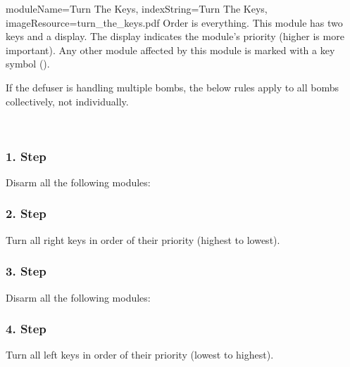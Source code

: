 \documentclass{../../ktane-mod}
\begin{document}
\begin{module}{
  moduleName=Turn The Keys,
  indexString=Turn The Keys,
  imageResource=turn_the_keys.pdf
}
{
  Order is everything.
}
  This module has two keys and a display.
  The display indicates the module's priority (higher is more important).
  Any other module affected by this module is marked with a key symbol (\keysymbol).

  If the defuser is handling multiple bombs, the below rules apply to all bombs collectively, not individually.

  \medskip\\
  \begin{multicols}{2}
  \begin{bulletlist}
  \end{bulletlist}
  \end{multicols}

  \subsubsection*{1. Step}
  Disarm all the following modules:
  \begin{multicols}{2}
    \begin{bulletlist}
    \end{bulletlist}
  \end{multicols}

  \subsubsection*{2. Step}
  Turn all right keys in order of their priority (highest to lowest).

  \subsubsection*{3. Step}
  Disarm all the following modules:
  \begin{multicols}{2}
    \begin{bulletlist}
    \end{bulletlist}
  \end{multicols}

  \subsubsection*{4. Step}
  Turn all left keys in \YELLOW[reverse] order of their priority (lowest to highest).
\end{module}
\end{document}
